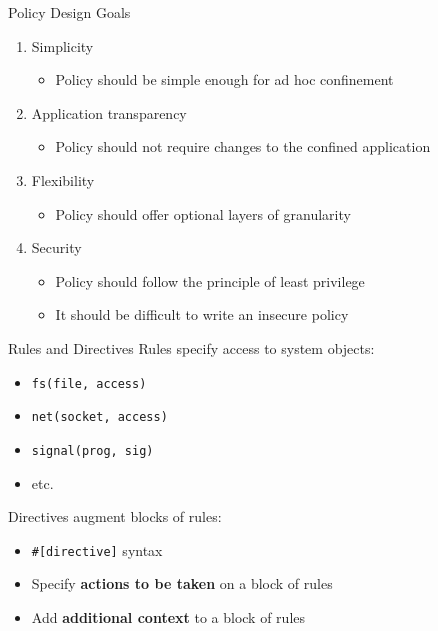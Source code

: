 \documentclass[12pt, dvipsnames]{beamer}
\begin{document}
\begin{frame}[c]{Policy Design Goals}
\begin{enumerate}
    \item Simplicity
    \begin{itemize}
        \item Policy should be simple enough for ad hoc confinement
    \end{itemize}
    \vfill
    \item Application transparency
    \begin{itemize}
        \item Policy should not require changes to the confined application
    \end{itemize}
    \vfill
    \item Flexibility
    \begin{itemize}
        \item Policy should offer optional layers of granularity
    \end{itemize}
    \vfill
    \item Security
    \begin{itemize}
        \item Policy should follow the principle of least privilege
        \item It should be difficult to write an insecure policy
    \end{itemize}
\end{enumerate}
\end{frame}

\begin{frame}[c, fragile]{Rules and Directives}
Rules specify access to system objects:
\begin{itemize}
    \item \lstinline[language=bpfbox]|fs(file, access)|
    \item \lstinline[language=bpfbox]|net(socket, access)|
    \item \lstinline[language=bpfbox]|signal(prog, sig)|
    \item etc.
\end{itemize}

\vfill
Directives augment blocks of rules:
\begin{itemize}
    \item \lstinline[language=bpfbox]|#[directive]| syntax
    \item Specify \textbf{actions to be taken} on a block of rules
    \item Add \textbf{additional context} to a block of rules
\end{itemize}
\end{frame}
\end{document}
